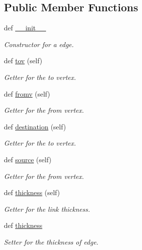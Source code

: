 \subsection*{Public Member Functions}
\begin{DoxyCompactItemize}
\item 
def \hyperlink{classbridges_1_1edge_1_1_edge_aafbac2adad409525c0fc55191fb7cfa8}{\+\_\+\+\_\+init\+\_\+\+\_\+}
\begin{DoxyCompactList}\small\item\em Constructor for a edge. \end{DoxyCompactList}\item 
def \hyperlink{classbridges_1_1edge_1_1_edge_a70e81381eaa6abafd0c40962326351a9}{tov} (self)
\begin{DoxyCompactList}\small\item\em Getter for the to vertex. \end{DoxyCompactList}\item 
def \hyperlink{classbridges_1_1edge_1_1_edge_a63bf9365bcaa4e07d687b845b1d6f9f2}{fromv} (self)
\begin{DoxyCompactList}\small\item\em Getter for the from vertex. \end{DoxyCompactList}\item 
def \hyperlink{classbridges_1_1edge_1_1_edge_aec8b0dbb915416ac8504684a2b3f6fe4}{destination} (self)
\begin{DoxyCompactList}\small\item\em Getter for the to vertex. \end{DoxyCompactList}\item 
def \hyperlink{classbridges_1_1edge_1_1_edge_a70271a1d9eaf4b6bdda3179b6821703e}{source} (self)
\begin{DoxyCompactList}\small\item\em Getter for the from vertex. \end{DoxyCompactList}\item 
def \hyperlink{classbridges_1_1edge_1_1_edge_a1155b5f604410cd46a81902bb8aa348b}{thickness} (self)
\begin{DoxyCompactList}\small\item\em Getter for the link thickness. \end{DoxyCompactList}\item 
def \hyperlink{classbridges_1_1edge_1_1_edge_a3137a2498d08d998471efde3bc1db1b4}{thickness}
\begin{DoxyCompactList}\small\item\em Setter for the thickness of edge. \end{DoxyCompactList}\item 

\end{DoxyCompactItemize}
